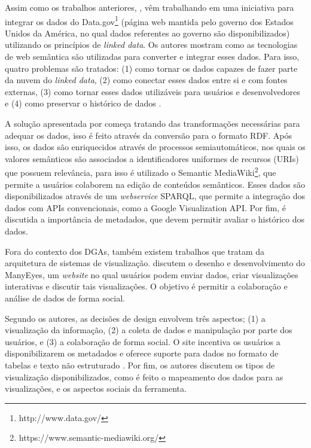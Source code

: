 Assim como os trabalhos anteriores, , vêm trabalhando em uma 
iniciativa para integrar os dados do Data.gov\footnote{ http://www.data.gov/} (página web 
mantida pelo governo dos Estados Unidos da América, no qual dados referentes ao governo são 
disponibilizados) utilizando os princípios de \textit{linked data}. Os autores mostram como 
as tecnologias de web semântica são utilizadas para converter e integrar esses dados. Para 
isso, quatro problemas são tratados: (1) como tornar os dados capazes de fazer parte da 
nuvem do \textit{linked data}, (2) como conectar esses dados entre si e com fontes externas, 
(3) como tornar esses dados utilizáveis para usuários e desenvolvedores e (4) como preservar 
o histórico de dados \cite{ding2010data}.

A solução apresentada por  começa tratando das transformações 
necessárias para adequar os dados, isso é feito através da conversão para o formato RDF. 
Após isso, os dados são enriquecidos através de processos semiautomáticos, nos quais os valores 
semânticos são associados a identificadores uniformes de recursos (URIs) que possuem 
relevância, para isso é utilizado o Semantic MediaWiki\footnote{https://www.semantic-mediawiki.org/}, 
que permite a usuários colaborem na edição de conteúdos semânticos. Esses dados são 
disponibilizados através de um \textit{webservice} SPARQL, que permite a integração dos dados 
com APIs convencionais, como a Google Visualization API. Por fim, é discutida a importância de 
metadados, que devem permitir avaliar o histórico dos dados.

Fora do contexto dos DGAs, também existem trabalhos que tratam da arquitetura de sistemas de 
visualização.  discutem o desenho e desenvolvimento do ManyEyes, um 
\textit{website} no qual usuários podem enviar dados, criar visualizações interativas e 
discutir tais visualizações. O objetivo é permitir a colaboração e análise de dados de forma 
social.

Segundo os autores, as decisões de design envolvem três aspectos; (1) a visualização da 
informação, (2) a coleta de dados e manipulação por parte dos usuários, e (3) a colaboração 
de forma social. O site incentiva os usuários a disponibilizarem os metadados e oferece 
suporte para dados no formato de tabelas e texto não estruturado \cite{viegas2007}. 
Por fim, os autores discutem os tipos de visualização disponibilizados, como é feito o 
mapeamento dos dados para as visualizações, e os aspectos sociais da ferramenta.

